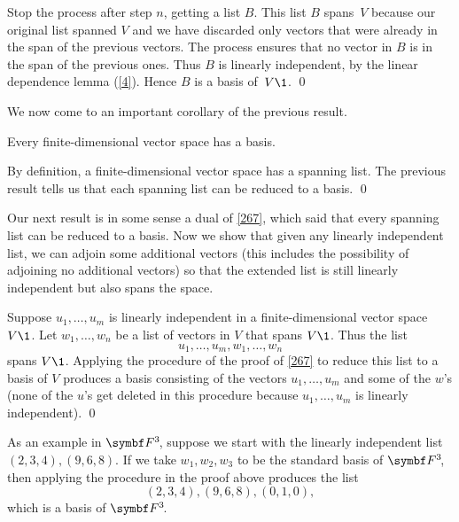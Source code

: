Stop the process after step $n$, getting a list $B$.  This list $B$
spans~$V$ because our original list spanned $V$ and we have discarded only vectors that
were already in the span of the previous  vectors.  The process ensures that no vector
in $B$ is in the span of  the previous ones.  Thus $B$ is linearly independent, by the
linear dependence lemma (\ref{4}).  Hence $B$ is a basis of~$V\1$.
\qed

We now come to an important corollary of the previous result.

{Every finite-dimensional vector space has a basis.}

\proof
By definition, a finite-dimensional vector space has a spanning list.  The
previous result tells us that each spanning list can be reduced to a basis.
\qed

Our next result is in some sense a dual of \ref{267}, which said that every
spanning list can be reduced to a basis.  Now we show that given any linearly
independent list, we can adjoin some additional vectors (this includes the possibility of adjoining no additional vectors) so that the extended list is still linearly independent but also spans the space.


\proof
Suppose $u_1, \dots, u_m$ is linearly independent in a finite-dimensional vector space $V\1$. Let $w_1, \dots, w_n$ be a list of vectors in $V$ that spans $V\1$. Thus the list
\[
u_1, \dots, u_m, w_1, \dots, w_n
\]
spans $V\1$. Applying the procedure of the proof of \ref{267} to reduce this list to a basis of $V$ produces a basis consisting of the vectors $u_1, \dots, u_m$ and some of the $w$'s (none of the $u$'s get deleted in this procedure because $u_1, \dots, u_m$ is linearly independent).
\qed

As an example in $\FF{3}$, suppose we start with the linearly independent list
$ (2, 3, 4), (9, 6, 8) $. If we take $w_1, w_2, w_3$ to be the standard basis of $\FF{3}$, then applying the procedure in the proof above produces the list
\[
(2, 3, 4), (9, 6, 8), (0, 1, 0),
\]
which is a basis of $\FF{3}$.


